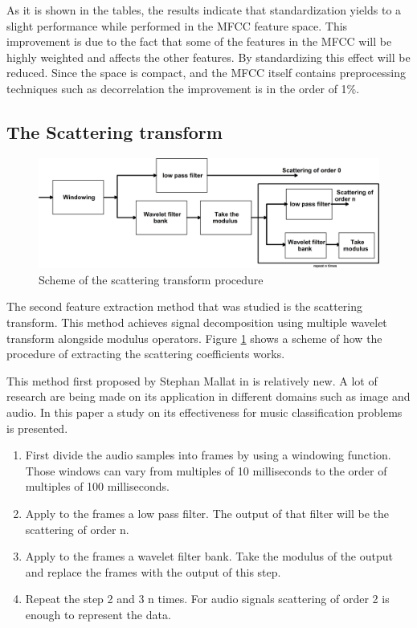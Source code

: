 \documentclass[hidelinks,12pt]{report}
\begin{document}
As it is shown in the tables, the results indicate that standardization yields to a slight performance while performed in the MFCC feature space. This improvement is due to the fact that some of the features in the MFCC will be highly weighted and affects the other features. By standardizing this effect will be reduced. Since the space is compact, and the MFCC itself contains preprocessing techniques such as decorrelation the improvement is in the order of 1\%.

\subsection{The Scattering transform}
\begin{figure}[t!]
  
  \centering
	    \includegraphics[width=1\textwidth]{scattering}
    \caption{Scheme of the scattering transform procedure }
    \label{scat}
\end{figure}
The second feature extraction method that was studied is the scattering transform. This method achieves signal decomposition using multiple wavelet transform alongside modulus operators. Figure \ref{scat} shows a scheme of how the procedure of extracting the scattering coefficients works.\par This method first proposed by Stephan Mallat in \cite{M10} is relatively new. A lot of research are being made on its application in different domains such as image and audio. In this paper a study on its effectiveness for music classification problems is presented.


\begin{enumerate}
\item First divide the audio samples into frames by using a windowing function. Those windows can vary from multiples of 10 milliseconds to the order of multiples of 100 milliseconds.  
\item Apply to the frames a low pass filter. The output of that filter will be the scattering of order n.
\item Apply to the frames a wavelet filter bank. Take the modulus of the output and replace the frames with the output of this step. 
\item Repeat the step 2 and 3 n times. For audio signals scattering of order 2 is enough to represent the data.
\end{enumerate}
\end{document}
